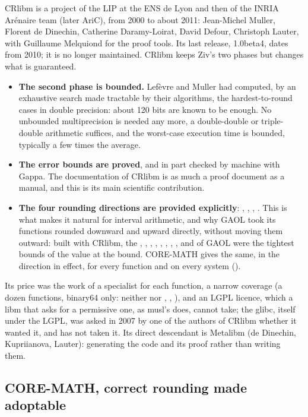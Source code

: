 CRlibm is a project of the LIP at the ENS de Lyon and then of the INRIA
Ar\'enaire team (later AriC), from 2000 to about 2011: Jean-Michel Muller,
Florent de Dinechin, Catherine Daramy-Loirat, David Defour, Christoph
Lauter, with Guillaume Melquiond for the proof tools. Its last release,
1.0beta4, dates from 2010; it is no longer maintained. CRlibm keeps Ziv's
two phases but changes what is guaranteed.
\begin{itemize}
\item[$\bullet$] \textbf{The second phase is bounded.} Lef\`evre and Muller
  had computed, by an exhaustive search made tractable by their algorithms,
  the hardest-to-round cases in double precision: about 120 bits are known
  to be enough. No unbounded multiprecision is needed any more, a
  double-double or triple-double arithmetic suffices, and the worst-case
  execution time is bounded, typically a few times the average.
\item[$\bullet$] \textbf{The error bounds are proved}, and in part checked
  by machine with Gappa. The documentation of CRlibm is as much a proof
  document as a manual, and this is its main scientific contribution.
\item[$\bullet$] \textbf{The four rounding directions are provided
  explicitly}: , , ,
  . This is what makes it natural for interval arithmetic,
  and why GAOL took its functions rounded downward and upward directly,
  without moving them outward: built with CRlibm, the ,
  , , , , , ,
  ,  and  of GAOL were the tightest bounds
  of the value at the bound. CORE-MATH gives the same, in the direction in
  effect, for every function and on every system
  ().
\end{itemize}
Its price was the work of a specialist for each function, a narrow coverage
(a dozen functions, binary64 only: neither  nor ,
, ), and an LGPL licence, which a libm that asks for a
permissive one, as musl's does, cannot take; the glibc, itself under the LGPL,
was asked in 2007 by one of the authors of CRlibm whether it wanted it, and has
not taken it. Its direct descendant is Metalibm (de Dinechin,
Kupriianova, Lauter): generating the code and its proof rather than writing
them.

\subsection{CORE-MATH, correct rounding made adoptable}

